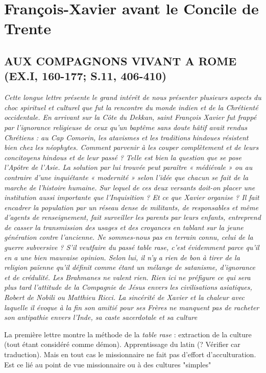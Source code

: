 \chapter{François-Xavier avant le Concile de Trente}

\section{AUX COMPAGNONS VIVANT A ROME
(EX.I, 160-177; S.11, 406-410)}

\textit{Cette longue lettre présente le grand intérêt de nous présenter
plusieurs aspects du choc spirituel et culturel que fut la rencontre
du monde indien et de la Chrétienté occidentale. En arrivant sur
la Côte du Dekkan, saint François Xavier fut frappé par l'ignorance
religieuse de ceux qu'un baptême sans doute hâtif avait rendus
Chrétiens : au Cap Comorin, les atavismes et les traditions hindoues résistent bien chez les néophytes. Comment parvenir à les
couper complètement et de leurs concitoyens hindous et de leur
passé ? Telle est bien la question que se pose l'Apôtre de l'Asie.
La solution par lui trouvée peut paraître « médiévale » ou au
contraire d'une inquiétante « modernité » selon l'idée que chacun
se fait de la marche de l'histoire humaine. Sur lequel de ces deux
versants doit-on placer une institution aussi importante que l'Inquisition
? Et ce que Xavier organise ? Il fait encadrer la population
par un réseau dense de militants, de responsables et même d'agents
de renseignement, fait surveiller les parents par leurs enfants, entreprend
de casser la transmission des usages et des croyances en
tablant sur la jeune génération contre l'ancienne. Ne sommes-nous
pas en terrain connu, celui de la guerre subversive ? S'il veutfaire
du passé table rase, c'est évidemment parce qu'il en a une bien
mauvaise opinion. Selon lui, il n'y a rien de bon à tirer de la religion
païenne qu'il définit comme étant un mélange de satanisme,
d'ignorance et de crédulité. Les Brahmanes ne valent rien. Rien ici
ne préfigure ce qui sera plus tard l'attitude de la Compagnie de
Jésus envers les civilisations asiatiques, Robert de Nobili ou Matthieu
Ricci. La sincérité de Xavier et la chaleur avec laquelle il évoque
à la fin son amitié pour ses Frères ne manquent pas de racheter
son antipathie envers l'Inde, sa caste sacerdotale et sa culture}


\begin{Synthesis}
La première lettre montre la méthode de la \textit{table rase} : extraction de la culture (tout étant considéré comme démon). Apprentissage du latin (? Vérifier car traduction). Mais en tout cas le missionnaire ne fait pas d'effort d'acculturation.
Est ce lié au point de vue missionnaire ou à des cultures "simples"
\end{Synthesis}

